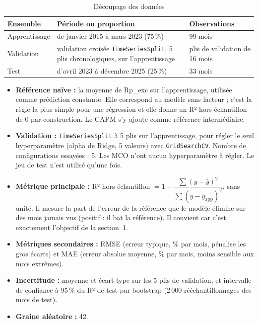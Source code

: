 \documentclass[11pt,a4paper]{article}
\begin{document}
\begin{table}[H]
\centering
\caption{Découpage des données}
\small
\begin{tabularx}{\textwidth}{|l|X|l|}
\hline
\textbf{Ensemble} & \textbf{Période ou proportion} & \textbf{Observations}\\\hline
Apprentissage & de janvier 2015 à mars 2023 (75\,\%) & 99 mois\\\hline
Validation & validation croisée \texttt{TimeSeriesSplit}, 5 plis chronologiques, sur l'apprentissage & plis de validation de 16 mois\\\hline
Test & d'avril 2023 à décembre 2025 (25\,\%) & 33 mois\\\hline
\end{tabularx}
\end{table}

\begin{itemize}[leftmargin=1.2cm]
\item \textbf{Référence naïve :} la moyenne de Rp\_exc sur l'apprentissage, utilisée comme prédiction constante. Elle correspond au modèle sans facteur ; c'est la règle la plus simple pour une régression et elle donne un R² hors échantillon de 0 par construction. Le CAPM s'y ajoute comme référence intermédiaire.
\item \textbf{Validation :} \texttt{TimeSeriesSplit} à 5 plis sur l'apprentissage, pour régler le seul hyperparamètre (alpha de Ridge, 5 valeurs) avec \texttt{GridSearchCV}. Nombre de configurations essayées : 5. Les MCO n'ont aucun hyperparamètre à régler. Le jeu de test n'est utilisé qu'une fois.
\item \textbf{Métrique principale :} R² hors échantillon $= 1-\dfrac{\sum (y-\hat{y})^2}{\sum (y-\bar{y}_{\mathrm{app}})^2}$, sans unité. Il mesure la part de l'erreur de la référence que le modèle élimine sur des mois jamais vus (positif : il bat la référence). Il convient car c'est exactement l'objectif de la section~1.
\item \textbf{Métriques secondaires :} RMSE (erreur typique, \% par mois, pénalise les gros écarts) et MAE (erreur absolue moyenne, \% par mois, moins sensible aux mois extrêmes).
\item \textbf{Incertitude :} moyenne et écart-type sur les 5 plis de validation, et intervalle de confiance à 95\,\% du R² de test par bootstrap (2\,000 rééchantillonnages des mois de test).
\item \textbf{Graine aléatoire :} 42.
\end{itemize}
\end{document}
